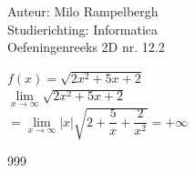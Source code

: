 \documentclass[a4paper]{article}
\newcommand{\fx}{\sqrt{2x^2+5x+2}}
\newcommand{\llim}[1]{ \lim\limits_{x \rightarrow #1} }
\begin{document}
\noindent \large Auteur: Milo Rampelbergh \\
\noindent \large Studierichting: Informatica\\
\noindent \large Oefeningenreeks 2D nr. 12.2\\

\medskip

\normalsize


$ f(x) = \fx $ \\

$ \llim{\infty} \fx $ \\

$ = \llim{\infty} |x| \sqrt{ 2+\dfrac{5}{x}+\dfrac{2}{x^2} } = +\infty $ \\


\begin{thebibliography}{999}
\end{thebibliography}
\end{document}
